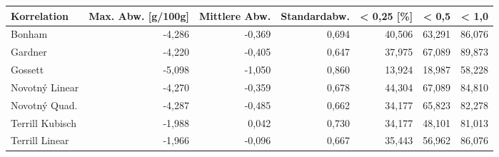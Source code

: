 \begin{tabular}{lrrrrrr}
\toprule
    Korrelation &  Max. Abw. [g/100g] &  Mittlere Abw. &  Standardabw. &  < 0,25 [\%] &  < 0,5 &  < 1,0 \\
\midrule
         Bonham &              -4,286 &         -0,369 &         0,694 &      40,506 & 63,291 & 86,076 \\
        Gardner &              -4,220 &         -0,405 &         0,647 &      37,975 & 67,089 & 89,873 \\
        Gossett &              -5,098 &         -1,050 &         0,860 &      13,924 & 18,987 & 58,228 \\
 Novotný Linear &              -4,270 &         -0,359 &         0,678 &      44,304 & 67,089 & 84,810 \\
  Novotný Quad. &              -4,287 &         -0,485 &         0,662 &      34,177 & 65,823 & 82,278 \\
Terrill Kubisch &              -1,988 &          0,042 &         0,730 &      34,177 & 48,101 & 81,013 \\
 Terrill Linear &              -1,966 &         -0,096 &         0,667 &      35,443 & 56,962 & 86,076 \\
\bottomrule
\end{tabular}

